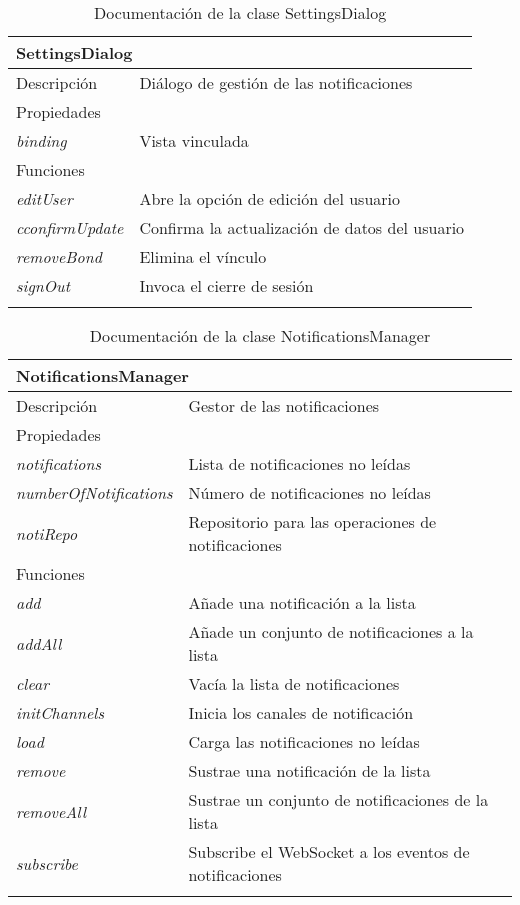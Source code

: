 \vspace{-31pt}
\begin{longtable}{|p{} p{}|}
    \hline
    \multicolumn{2}{|l|}{\textbf{SettingsDialog}} \\ \hline \hline
    Descripción      & Diálogo de gestión de las notificaciones \\ \hline
    \multicolumn{2}{|l|}{Propiedades} \\
    \emph{binding}  & Vista vinculada  \\ \hline
    \multicolumn{2}{|l|}{Funciones} \\
    \emph{editUser} & Abre la opción de edición del usuario \\
    \emph{cconfirmUpdate} & Confirma la actualización de datos del usuario \\
    \emph{removeBond} & Elimina el vínculo \\
    \emph{signOut}  & Invoca el cierre de sesión \\ \hline
    \caption{Documentación de la clase SettingsDialog}
    \label{dis:app:settings_dialog}
\end{longtable}

\begin{longtable}{|p{} p{}|}
    \hline
    \multicolumn{2}{|l|}{\textbf{NotificationsManager}} \\ \hline \hline
    Descripción      & Gestor de las notificaciones \\ \hline
    \multicolumn{2}{|l|}{Propiedades} \\
    \emph{notifications}  & Lista de notificaciones no leídas  \\
    \emph{numberOfNotifications}  & Número de notificaciones no leídas  \\
    \emph{notiRepo}  & Repositorio para las operaciones de notificaciones  \\ \hline
    \multicolumn{2}{|l|}{Funciones} \\
    \emph{add}  & Añade una notificación a la lista \\
    \emph{addAll}  & Añade un conjunto de notificaciones a la lista \\ 
    \emph{clear}  & Vacía la lista de notificaciones \\
    \emph{initChannels} & Inicia los canales de notificación \\
    \emph{load}  & Carga las notificaciones no leídas \\
    \emph{remove}  & Sustrae una notificación de la lista \\ 
    \emph{removeAll}  & Sustrae un conjunto de notificaciones de la lista \\
    \emph{subscribe}  & Subscribe el WebSocket a los eventos de notificaciones \\  \hline
    \caption{Documentación de la clase NotificationsManager}
    \label{dis:app:notifications_manager}
\end{longtable}

